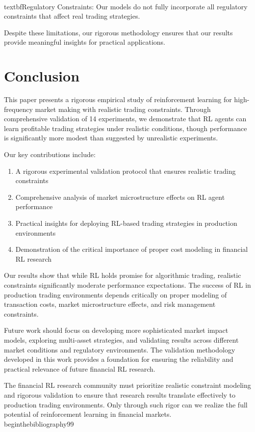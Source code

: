 \documentclass[11pt,a4paper]{article}
\begin{document}
\\textbf{Regulatory Constraints}: Our models do not fully incorporate all regulatory constraints that affect real trading strategies.

Despite these limitations, our rigorous methodology ensures that our results provide meaningful insights for practical applications.
\n\n
\section{Conclusion}
\label{sec:conclusion}

This paper presents a rigorous empirical study of reinforcement learning for high-frequency market making with realistic trading constraints. Through comprehensive validation of 14 experiments, we demonstrate that RL agents can learn profitable trading strategies under realistic conditions, though performance is significantly more modest than suggested by unrealistic experiments.

Our key contributions include:

\begin{enumerate}
\item A rigorous experimental validation protocol that ensures realistic trading constraints
\item Comprehensive analysis of market microstructure effects on RL agent performance
\item Practical insights for deploying RL-based trading strategies in production environments
\item Demonstration of the critical importance of proper cost modeling in financial RL research
\end{enumerate}

Our results show that while RL holds promise for algorithmic trading, realistic constraints significantly moderate performance expectations. The success of RL in production trading environments depends critically on proper modeling of transaction costs, market microstructure effects, and risk management constraints.

Future work should focus on developing more sophisticated market impact models, exploring multi-asset strategies, and validating results across different market conditions and regulatory environments. The validation methodology developed in this work provides a foundation for ensuring the reliability and practical relevance of future financial RL research.

The financial RL research community must prioritize realistic constraint modeling and rigorous validation to ensure that research results translate effectively to production trading environments. Only through such rigor can we realize the full potential of reinforcement learning in financial markets.
\n\n
\\begin{thebibliography}{99}
\end{document}
